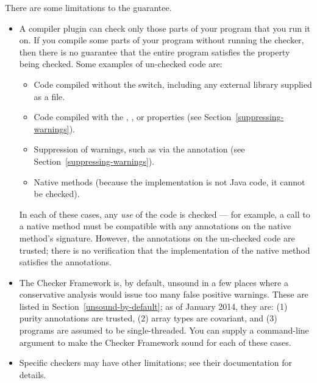 There are some limitations to the guarantee.


\begin{itemize}

\item
  A compiler plugin can check only those parts of your program that you run
  it on.  If you compile some parts of your program without running the
  checker, then there is no guarantee that the entire program satisfies the
  property being checked.  Some examples of un-checked code are:

  \begin{itemize}
  \item
    Code compiled without the  switch, including any
    external library supplied as a  file.
  \item
    Code compiled with the , ,  or 
    properties (see Section~\ref{suppressing-warnings}).
  \item
    Suppression of warnings, such as via the 
    annotation (see Section~\ref{suppressing-warnings}).
  \item
    Native methods (because the implementation is not Java code, it cannot
    be checked).
  \end{itemize}

  In each of these cases, any \emph{use} of the code is checked --- for
  example, a call to a native method must be compatible with any
  annotations on the native method's signature.
  However, the annotations on the un-checked code are trusted; there is no
  verification that the implementation of the native method satisfies the
  annotations.

\item
  The Checker Framework is, by default, unsound in a few places where a
  conservative analysis would issue too many false positive warnings.
  These are listed in Section~\ref{unsound-by-default}; as of January 2014,
  they are: (1) purity annotations are trusted, (2) array types are
  covariant, and (3) programs are assumed to be single-threaded.
  You can supply a command-line argument to make the Checker Framework
  sound for each of these cases.


\item
  Specific checkers may have other limitations; see their documentation for
  details.

\end{itemize}

